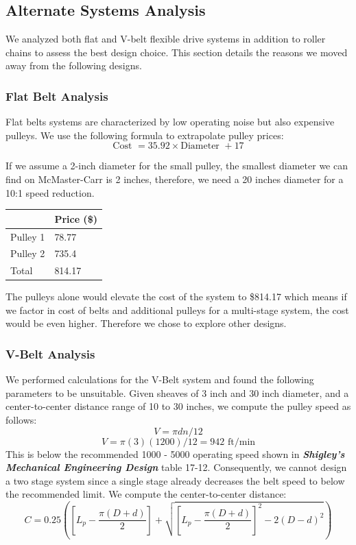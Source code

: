 \documentclass[letterpaper,12pt]{article}
\begin{document}
\subsection{Alternate Systems Analysis}
We analyzed both flat and V-belt flexible drive systems in addition to roller chains to assess the best design choice. This section details the reasons we moved away from the following designs. 
\subsubsection{Flat Belt Analysis}
Flat belts systems are characterized by low operating noise but also  expensive pulleys. We use the following formula to extrapolate pulley prices:
\begin{equation}
\text{Cost }=35.92 \times \text{Diameter }+17
\end{equation}

\noindent If we assume a 2-inch diameter for the small pulley, the smallest diameter we can find on McMaster-Carr is 2 inches, therefore, we need a 20 inches diameter for a 10:1 speed reduction. 
\begin{center}
	\begin{tabular}{ |p{3cm}|p{4cm}| }
		\hline
		& Price (\$) \\
		\hline
		Pulley 1 & 78.77\\
		\hline
		Pulley 2 & 735.4\\
		\hline
		Total & 814.17\\
		\hline
	\end{tabular}
\end{center}

\noindent The pulleys alone would elevate the cost of the system to \$814.17 which means if we factor in cost of belts and additional pulleys for a multi-stage system, the cost would be even higher. Therefore we chose to explore other designs.

\subsubsection{V-Belt Analysis}
We performed calculations for the V-Belt system and found the following parameters to be unsuitable. Given sheaves of 3 inch and 30 inch diameter, and a center-to-center distance range of 10 to 30 inches, we compute the pulley speed as follows:
\begin{equation}
    V = \pi dn/12
\end{equation}
$$V = \pi(3)(1200)/12 = 942 \text{ ft/min}$$
This is below the recommended 1000 - 5000 operating speed shown in \textbf{\textit{Shigley's Mechanical Engineering Design}} table 17-12. Consequently, we cannot design a two stage system since a single stage already decreases the belt speed to below the recommended limit. 
We compute the center-to-center distance:
\begin{equation}
    C = 0.25 \left(\left[L_p - \frac{\pi(D+d)}{2}\right]+\sqrt{\left[L_p - \frac{\pi(D+d)}{2}\right]^2-2(D-d)^2}\right)
\end{equation}
\end{document}
